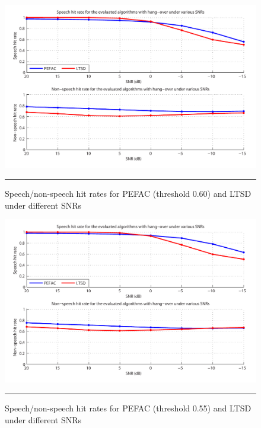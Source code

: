 \vfill

\begin{figure}[htbp]
	\centering
		\includegraphics[width=0.9\columnwidth]{Figures/Chapter5/pefacSNR60bold.pdf}
		\rule{37em}{0.5pt}
	\caption[Speech/non-speech hit rates for PEFAC (threshold 0.60) and LTSD under different SNRs]{Speech/non-speech hit rates for PEFAC (threshold 0.60) and LTSD under different SNRs}
	\label{fig:pefacSNR60}
\end{figure}

\clearpage

\begin{figure}[htbp]
	\centering
		\includegraphics[width=0.9\columnwidth]{Figures/Chapter5/pefacSNR55bold.pdf}
		\rule{37em}{0.5pt}
	\caption[Speech/non-speech hit rates for PEFAC (threshold 0.55) and LTSD under different SNRs]{Speech/non-speech hit rates for PEFAC (threshold 0.55) and LTSD under different SNRs}
	\label{fig:pefacSNR55}
\end{figure}


